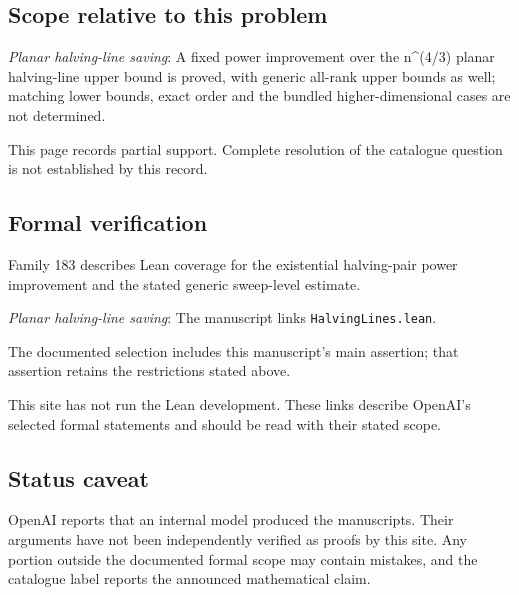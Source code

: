 \documentclass[11pt]{article}
\begin{document}
\subsection{Scope relative to this problem}
\textit{Planar halving-line saving}: A fixed power improvement over the n\textasciicircum{}(4/3) planar halving-line upper bound is proved, with generic all-rank upper bounds as well; matching lower bounds, exact order and the bundled higher-dimensional cases are not determined.

This page records partial support. Complete resolution of the catalogue question is not established by this record.

\subsection{Formal verification}
Family 183 describes Lean coverage for the existential halving-pair power improvement and the stated generic sweep-level estimate.

\textit{Planar halving-line saving}: The manuscript links \texttt{HalvingLines.lean}.

The documented selection includes this manuscript’s main assertion; that assertion retains the restrictions stated above.

This site has not run the Lean development. These links describe OpenAI’s selected formal statements and should be read with their stated scope.

\subsection{Status caveat}
OpenAI reports that an internal model produced the manuscripts. Their arguments have not been independently verified as proofs by this site. Any portion outside the documented formal scope may contain mistakes, and the catalogue label reports the announced mathematical claim.
\end{document}
